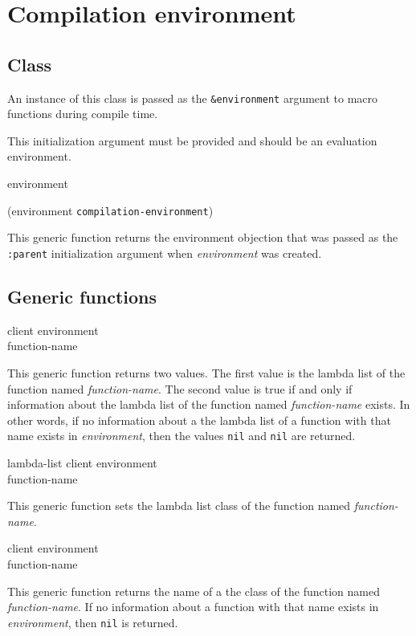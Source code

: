 \chapter{Compilation environment}

\section{Class}


An instance of this class is passed as the \texttt{\&environment}
argument to macro functions during compile time.


This initialization argument must be provided and should be
an evaluation environment.

 {environment}

 {(environment {\tt compilation-environment})}

This generic function returns the environment objection that was passed
as the \texttt{:parent} initialization argument when
\textit{environment} was created.

\section{Generic functions}

 {client environment \\ function-name}

This generic function returns two values.  The first value is the
lambda list of the function named \textit{function-name}.  The second
value is true if and only if information about the lambda list of the
function named \textit{function-name} exists.  In other words, if no
information about a the lambda list of a function with that name
exists in \textit{environment}, then the values \texttt{nil} and
\texttt{nil} are returned.

 {lambda-list client environment \\
function-name}

This generic function sets the lambda list class of the function
named \textit{function-name}.

 {client environment \\ function-name}

This generic function returns the name of a the class of the function
named \textit{function-name}.  If no information about a
function with that name exists in \textit{environment}, then
\texttt{nil} is returned.

